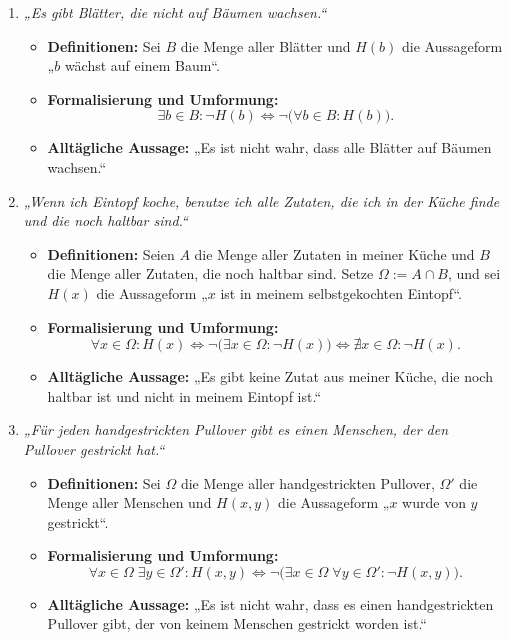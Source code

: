 \begin{enumerate}
    \item \emph{„Es gibt Blätter, die nicht auf Bäumen wachsen.“}
    \begin{itemize}
        \item \textbf{Definitionen:} Sei $B$ die Menge aller Blätter und $H(b)$ die Aussageform „$b$ wächst auf einem Baum“.
        \item \textbf{Formalisierung und Umformung:}
        \[
            \exists b\in B : \neg H(b)
            \iff \neg\bigl(\forall b\in B : H(b)\bigr).
        \]
        \item \textbf{Alltägliche Aussage:} „Es ist nicht wahr, dass alle Blätter auf Bäumen wachsen.“
    \end{itemize}

    \item \emph{„Wenn ich Eintopf koche, benutze ich alle Zutaten, die ich in der Küche finde und die noch haltbar sind.“}
    \begin{itemize}
        \item \textbf{Definitionen:} Seien $A$ die Menge aller Zutaten in meiner Küche und $B$ die Menge aller Zutaten, die noch haltbar sind. Setze $\Omega := A\cap B$, und sei $H(x)$ die Aussageform „$x$ ist in meinem selbstgekochten Eintopf“.
        \item \textbf{Formalisierung und Umformung:}
        \[
            \forall x\in\Omega : H(x)
            \iff \neg\bigl(\exists x\in\Omega : \neg H(x)\bigr)
            \iff \nexists x\in\Omega : \neg H(x).
        \]
        \item \textbf{Alltägliche Aussage:} „Es gibt keine Zutat aus meiner Küche, die noch haltbar ist und nicht in meinem Eintopf ist.“
    \end{itemize}

    \item \emph{„Für jeden handgestrickten Pullover gibt es einen Menschen, der den Pullover gestrickt hat.“}
    \begin{itemize}
        \item \textbf{Definitionen:} Sei $\Omega$ die Menge aller handgestrickten Pullover, $\Omega'$ die Menge aller Menschen und $H(x,y)$ die Aussageform „$x$ wurde von $y$ gestrickt“.
        \item \textbf{Formalisierung und Umformung:}
        \[
            \forall x\in\Omega\;\exists y\in\Omega' : H(x,y)
            \iff \neg\bigl(\exists x\in\Omega\;\forall y\in\Omega' : \neg H(x,y)\bigr).
        \]
        \item \textbf{Alltägliche Aussage:} „Es ist nicht wahr, dass es einen handgestrickten Pullover gibt, der von keinem Menschen gestrickt worden ist.“
    \end{itemize}
\end{enumerate}

